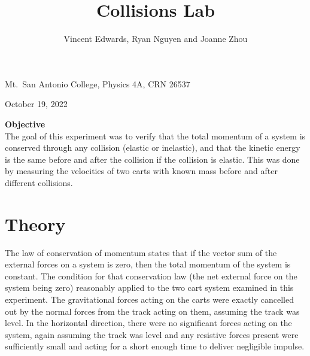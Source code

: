 \documentclass[12pt]{iopart} %
\begin{document}
\title{Collisions Lab}

\author{Vincent Edwards, Ryan Nguyen and Joanne Zhou}

\vspace{10pt}
\begin{indented}
  \item[]Mt.~San Antonio College, Physics 4A, CRN 26537
  \item[]October 19, 2022
  \vspace{10pt}
  \item[]\textbf{Objective}\\
    The goal of this experiment was to verify that the total momentum of a system is conserved through any collision (elastic or inelastic), and that the kinetic energy is the same before and after the collision if the collision is elastic.
    This was done by measuring the velocities of two carts with known mass before and after different collisions.
\end{indented}


\section{Theory}

The law of conservation of momentum states that if the vector sum of the external forces on a system is zero, then the total momentum of the system is constant.
The condition for that conservation law (the net external force on the system being zero) reasonably applied to the two cart system examined in this experiment.
The gravitational forces acting on the carts were exactly cancelled out by the normal forces from the track acting on them, assuming the track was level.
In the horizontal direction, there were no significant forces acting on the system, again assuming the track was level and any resistive forces present were sufficiently small and acting for a short enough time to deliver negligible impulse.
\end{document}
